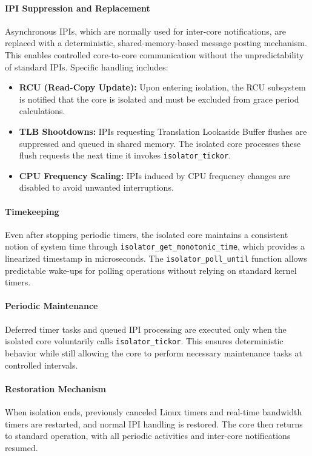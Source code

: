 \documentclass[letterpaper]{article}
\begin{document}
\paragraph{IPI Suppression and Replacement}  
Asynchronous IPIs, which are normally used for inter-core notifications, are replaced with a deterministic,
shared-memory-based message posting mechanism. This enables controlled core-to-core communication without
the unpredictability of standard IPIs. Specific handling includes:
\begin{itemize}
    \item \textbf{RCU (Read-Copy Update):} Upon entering isolation, the RCU subsystem is notified that the core is isolated and must be excluded from grace period calculations. 
    \item \textbf{TLB Shootdowns:} IPIs requesting Translation Lookaside Buffer flushes are suppressed and queued in shared memory.
      The isolated core processes these flush requests the next time it invokes \texttt{isolator\_tickor}.
    \item \textbf{CPU Frequency Scaling:} IPIs induced by CPU frequency changes are disabled to avoid unwanted interruptions.
\end{itemize}

\paragraph{Timekeeping}  
Even after stopping periodic timers, the isolated core maintains a consistent notion of system time through \texttt{isolator\_get\_monotonic\_time}, which provides a linearized timestamp in microseconds. The \texttt{isolator\_poll\_until} function allows predictable wake-ups for polling operations without relying on standard kernel timers.

\paragraph{Periodic Maintenance}  
Deferred timer tasks and queued IPI processing are executed only when the isolated core voluntarily calls \texttt{isolator\_tickor}. This ensures deterministic behavior while still allowing the core to perform necessary maintenance tasks at controlled intervals.

\paragraph{Restoration Mechanism}  
When isolation ends, previously canceled Linux timers and real-time bandwidth timers are restarted, and normal IPI handling is restored. The core then returns to standard operation, with all periodic activities and inter-core notifications resumed.
\end{document}
